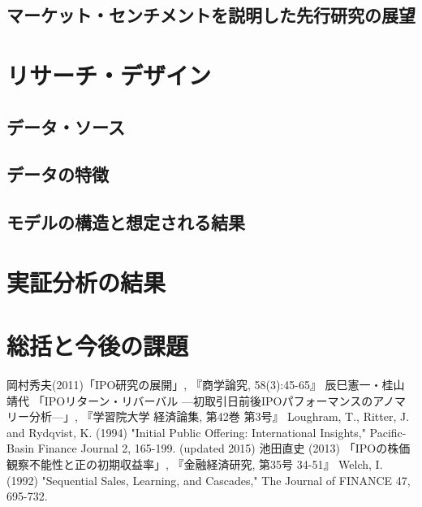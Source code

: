 \documentclass{jsarticle}
\begin{document}
\subsection{マーケット・センチメントを説明した先行研究の展望}

	
\section{リサーチ・デザイン}
\subsection{データ・ソース}
\subsection{データの特徴}
\subsection{モデルの構造と想定される結果}
\section{実証分析の結果}
\section{総括と今後の課題}

\newpage


\begin{thebibliography}{99}
 岡村秀夫(2011)「IPO研究の展開」, 『商学論究, 58(3):45-65』
 辰巳憲一・桂山靖代 「IPOリターン・リバーバル —初取引日前後IPOパフォーマンスのアノマリー分析—」, 『学習院大学 経済論集, 第42巻 第3号』
 Loughram, T., Ritter, J. and Rydqvist, K. (1994) "Initial Public Offering: International Insights," Pacific-Basin Finance Journal 2, 165-199. (updated 2015)
 池田直史 (2013) 「IPOの株価観察不能性と正の初期収益率」, 『金融経済研究, 第35号 34-51』
 Welch, I. (1992) "Sequential Sales, Learning, and Cascades," The Journal of FINANCE 47, 695-732.
\end{thebibliography}
\end{document}
